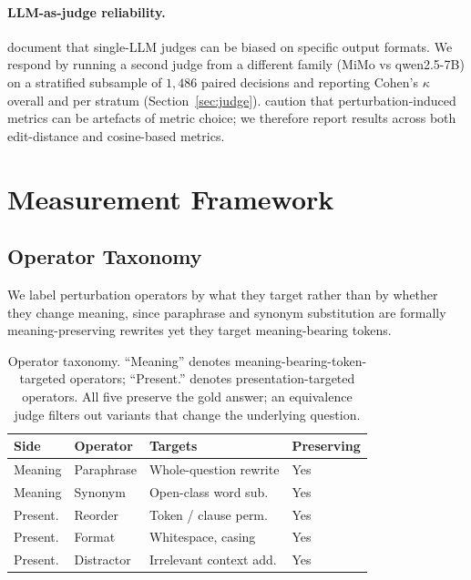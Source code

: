 \documentclass[11pt]{article}
\begin{document}
\paragraph{LLM-as-judge reliability.}
\citet{Zheng2023Judge} document that single-LLM judges can be biased on specific output formats. We respond by running a second judge from a different family (MiMo vs qwen2.5-7B) on a stratified subsample of $1{,}486$ paired decisions and reporting Cohen's $\kappa$ overall and per stratum (Section~\ref{sec:judge}). \citet{Schaeffer2023Mirage} caution that perturbation-induced metrics can be artefacts of metric choice; we therefore report results across both edit-distance and cosine-based metrics.

\section{Measurement Framework}
\label{sec:method}

\subsection{Operator Taxonomy}
\label{sec:operators}

We label perturbation operators by what they target rather than by whether they change meaning, since paraphrase and synonym substitution are formally meaning-preserving rewrites yet they target meaning-bearing tokens.

\begin{table}[t]
  \centering
  \small
  \begin{tabular}{@{}llll@{}}
    \toprule
    Side & Operator & Targets & Preserving \\
    \midrule
    Meaning & Paraphrase & Whole-question rewrite & Yes \\
    Meaning & Synonym & Open-class word sub. & Yes \\
    Present. & Reorder & Token / clause perm. & Yes \\
    Present. & Format & Whitespace, casing & Yes \\
    Present. & Distractor & Irrelevant context add. & Yes \\
    \bottomrule
  \end{tabular}
  \caption{Operator taxonomy. ``Meaning'' denotes meaning-bearing-token-targeted operators; ``Present.'' denotes presentation-targeted operators. All five preserve the gold answer; an equivalence judge filters out variants that change the underlying question.}
  \label{tab:operators}
\end{table}
\end{document}
